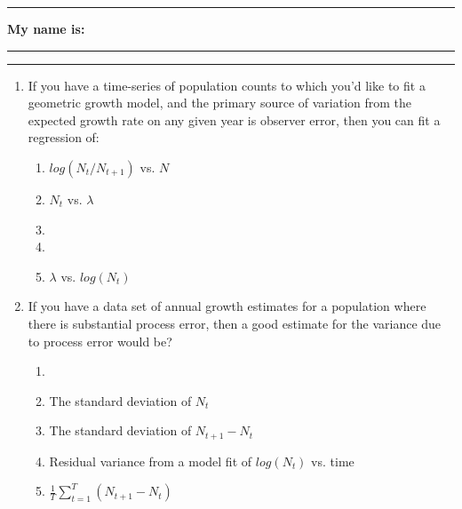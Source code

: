 \documentclass{article}
\newcommand*{\blanks}[1][4em]{\rule{#1}{.4pt}}
\begin{document}
\noindent{}

\rule[0.5ex]{\linewidth}{1pt}
\begin{center}
	\textbf{My name is:} \blanks[150pt]
\end{center}
\rule[0.5ex]{\linewidth}{1pt}

\begin{enumerate}
\item If you have a time-series of population counts to which you’d like to fit a geometric growth model, and the primary source of variation from the expected growth rate on any given year is observer error, then you can fit a regression of: 
\begin{enumerate}
	\item $log \left( N_t / N_{t+1} \right)$ vs. $N$
	\item $N_t$ vs. $\lambda$
	\item {}
	\item {}
	\item $\lambda$ vs. $log (N_t)$
\end{enumerate}

\item If you have a data set of annual growth estimates for a population where there is substantial process error, then a good estimate for the variance due to process error would be?
\begin{enumerate}
	\item {}
	\item The standard deviation of $N_t$
	\item The standard deviation of $N_{t+1}-N_t$
	\item Residual variance from a model fit of $log(N_t)$ vs. time
	\item $\frac{1}{T}\sum_{t=1}^T\left( N_{t+1}-N_t \right)$
\end{enumerate}

\end{enumerate}
\vspace{1cm}
\end{document}
